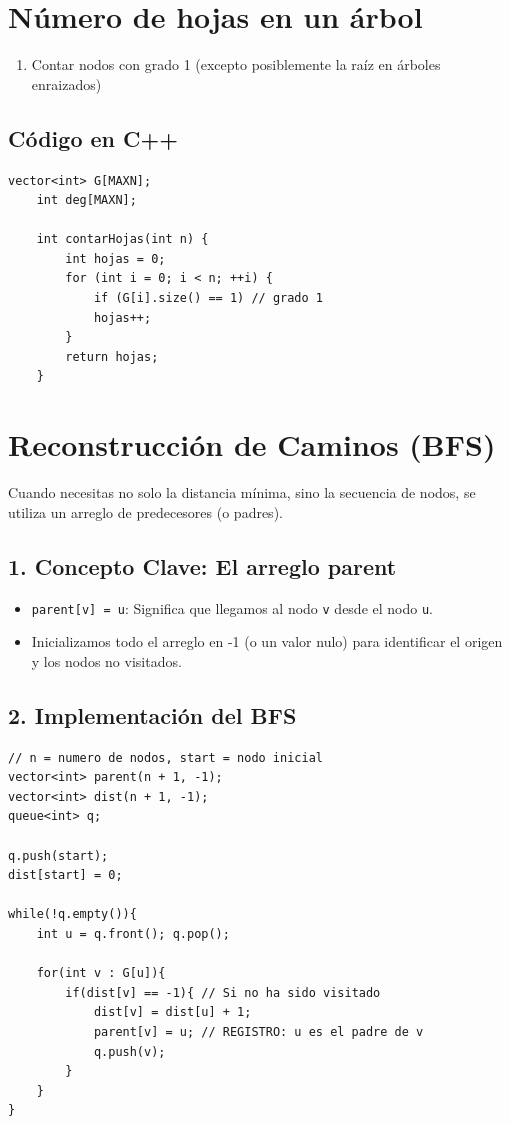 \section{Número de hojas en un árbol}

\begin{enumerate}
	\item Contar nodos con grado 1 (excepto posiblemente la raíz en árboles enraizados)
\end{enumerate}

\subsection*{Código en C++}

\begin{lstlisting}[caption=Contar hojas en un árbol]
	vector<int> G[MAXN];
	int deg[MAXN];
	
	int contarHojas(int n) {
		int hojas = 0;
		for (int i = 0; i < n; ++i) {
			if (G[i].size() == 1) // grado 1
			hojas++;
		}
		return hojas;
	}
\end{lstlisting}

\section{Reconstrucción de Caminos (BFS)}

Cuando necesitas no solo la distancia mínima, sino la secuencia de nodos, se utiliza un arreglo de predecesores (o padres).

\subsection*{1. Concepto Clave: El arreglo parent}

\begin{itemize}
	\item \texttt{parent[v] = u}: Significa que llegamos al nodo \texttt{v} desde el nodo \texttt{u}.
	\item Inicializamos todo el arreglo en -1 (o un valor nulo) para identificar el origen y los nodos no visitados.
\end{itemize}

\subsection*{2. Implementación del BFS}

\begin{lstlisting}[caption=BFS con arreglo parent]
// n = numero de nodos, start = nodo inicial
vector<int> parent(n + 1, -1);
vector<int> dist(n + 1, -1);
queue<int> q;

q.push(start);
dist[start] = 0;

while(!q.empty()){
	int u = q.front(); q.pop();
	
	for(int v : G[u]){
		if(dist[v] == -1){ // Si no ha sido visitado
			dist[v] = dist[u] + 1;
			parent[v] = u; // REGISTRO: u es el padre de v
			q.push(v);
		}
	}
}
\end{lstlisting}

